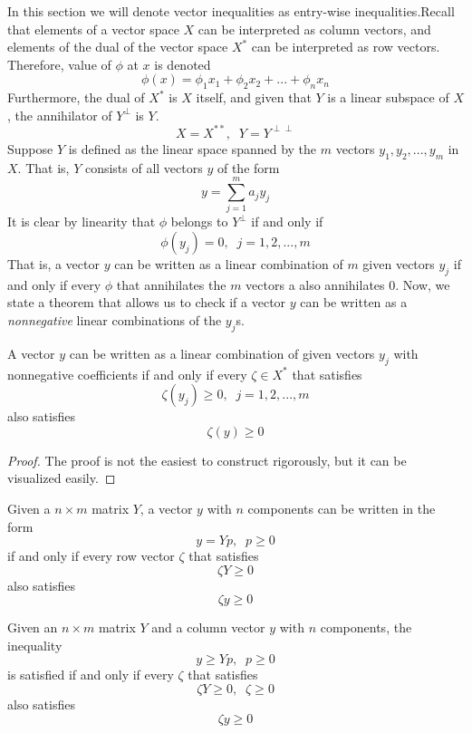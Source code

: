 \documentclass{article}
\begin{document}
    In this section we will denote vector inequalities as entry-wise inequalities.Recall that elements of a vector space $X$ can be interpreted as column vectors, and elements of the dual of the vector space $X^*$ can be interpreted as row vectors. Therefore, value of $\phi$ at $x$ is denoted
    \[\phi (x) = \phi_1 x_1 + \phi_2 x_2 + ... + \phi_n x_n\]
    Furthermore, the dual of $X^*$ is $X$ itself, and given that $Y$ is a linear subspace of $X$, the annihilator of $Y^\perp$ is $Y$. 
    \[X = X^{**}, \;\; Y = Y^{\perp\perp}\]
    Suppose $Y$ is defined as the linear space spanned by the $m$ vectors $y_1, y_2, ..., y_m$ in $X$. That is, $Y$ consists of all vectors $y$ of the form
    \[y = \sum_{j=1}^m a_j y_j\]
    It is clear by linearity that $\phi$ belongs to $Y^\perp$ if and only if
    \[\phi (y_j) = 0, \;\; j = 1, 2, ..., m\]
    That is, a vector $y$ can be written as a linear combination of $m$ given vectors $y_j$ if and only if every $\phi$ that annihilates the $m$ vectors a also annihilates $0$. Now, we state a theorem that allows us to check if a vector $y$ can be written as a \textit{nonnegative} linear combinations of the $y_j$s. 

    \begin{theorem}
    A vector $y$ can be written as a linear combination of given vectors $y_j$ with nonnegative coefficients if and only if every $\zeta \in X^*$ that satisfies 
    \[ \zeta (y_j) \geq 0, \;\; j = 1, 2, ..., m\]
    also satisfies 
    \[\zeta (y) \geq 0\]
    \end{theorem}
    \begin{proof}
    The proof is not the easiest to construct rigorously, but it can be visualized easily. 
    \end{proof}

    \begin{corollary}
    Given a $n \times m$ matrix $Y$, a vector $y$ with $n$ components can be written in the form 
    \[y = Y p, \;\; p \geq 0\]
    if and only if every row vector $\zeta$ that satisfies 
    \[\zeta Y \geq 0\]
    also satisfies 
    \[\zeta y \geq 0\]
    \end{corollary}

    \begin{theorem}
    Given an $n \times m$ matrix $Y$ and a column vector $y$ with $n$ components, the inequality 
    \[y \geq Y p, \;\; p \geq 0\]
    is satisfied if and only if every $\zeta$ that satisfies
    \[\zeta Y \geq 0, \;\; \zeta \geq 0\]
    also satisfies 
    \[\zeta y \geq 0\]
    \end{theorem}
\end{document}
